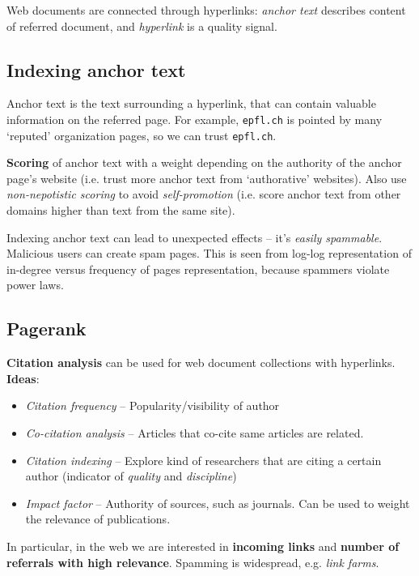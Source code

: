 Web documents are connected through hyperlinks: \emph{anchor text} describes content of referred document, and \emph{hyperlink} is a quality signal.

\subsection{Indexing anchor text} %
\label{sub:indexing_anchor_text}
  Anchor text is the text surrounding a hyperlink, that can contain valuable information on the referred page. For example, \texttt{epfl.ch} is pointed by many `reputed' organization pages, so we can trust \texttt{epfl.ch}.

  \textbf{Scoring} of anchor text with a weight depending on the authority of the anchor page's website (i.e. trust more anchor text from `authorative' websites). Also use \emph{non-nepotistic scoring} to avoid \emph{self-promotion} (i.e. score anchor text from other domains higher than text from the same site).

  Indexing anchor text can lead to unexpected effects -- it's \emph{easily spammable}. Malicious users can create spam pages. This is seen from log-log representation of in-degree versus frequency of pages representation, because spammers violate power laws.

\subsection{Pagerank} %
\label{sub:link_based_ranking_pagerank}
  \textbf{Citation analysis} can be used for web document collections with hyperlinks. \textbf{Ideas}:
  \begin{itemize}
    \item \emph{Citation frequency} -- Popularity/visibility of author
    \item \emph{Co-citation analysis} -- Articles that co-cite same articles are related.
    \item \emph{Citation indexing} -- Explore kind of researchers that are citing a certain author (indicator of \emph{quality} and \emph{discipline})
    \item \emph{Impact factor} -- Authority of sources, such as journals. Can be used to weight the relevance of publications.
  \end{itemize}

  In particular, in the web we are interested in \textbf{incoming links} and \textbf{number of referrals with high relevance}. Spamming is widespread, e.g. \emph{link farms}.

